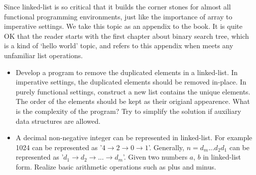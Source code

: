 \documentclass[UTF8]{article}
\begin{document}
Since linked-list is so critical that it builds the corner stones for almost all functional programming
environments, just like the importance of array to imperative settings. We take this topic as an appendix
to the book. It is quite OK that the reader starts with the first chapter about binary search tree, which
is a kind of `hello world' topic, and refers to this appendix when meets any unfamiliar list operations.

\begin{Exercise}
\begin{itemize}
\item Develop a program to remove the duplicated elements in a linked-list.
In imperative settings, the duplicated elements should be removed in-place. In purely functional
settings, construct a new list contains the unique elements. The order of the elements
should be kept as their origianl appearence. What is the complexity of the
program? Try to simplify the solution if auxiliary data structures are allowed.
\item A decimal non-negative integer can be represented in linked-list. For example 1024 can be represented as
'$4 \rightarrow 2 \rightarrow 0 \rightarrow 1$'. Generally, $n = d_m...d_2d_1$ can be represented as
'$d_1 \rightarrow d_2 \rightarrow ... \rightarrow d_m$'. Given two numbers $a$, $b$ in linked-list form.
Realize basic arithmetic operations such as plus and minus.
\end{itemize}
\end{Exercise}

\end{document}

